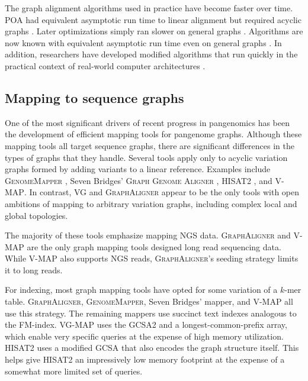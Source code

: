 \documentclass[11pt]{ucthesis}
\begin{document}
The graph alignment algorithms used in practice have become faster over time.
POA had equivalent asymptotic run time to linear alignment but required acyclic graphs \cite{lee2002multiple}. 
Later optimizations simply ran slower on general graphs \cite{kavya2019sequence}.
Algorithms are now known with equivalent asymptotic run time even on general graphs \cite{jain2020complexity}.
In addition, researchers have developed modified algorithms that run quickly in the practical context of real-world computer architectures \cite{rautiainen2019bit,jain2019accelerating,ivanov2020astarix}.

\subsection{Mapping to sequence graphs}

One of the most significant drivers of recent progress in pangenomics has been the development of efficient mapping tools for pangenome graphs.
Although these mapping tools all target sequence graphs, there are significant differences in the types of graphs that they handle.
Several tools apply only to acyclic variation graphs formed by adding variants to a linear reference.
Examples include \textsc{GenomeMapper} \cite{schneeberger2009simultaneous}, Seven Bridges' \textsc{Graph Genome Aligner} \cite{rakocevic2019fast}, \textsc{HISAT2} \cite{kim2019graph}, and \textsc{V-MAP}\cite{vaddadi2019read}.
In contrast, \textsc{VG} \cite{garrison2018variation} and \textsc{GraphAligner} \cite{rautiainen2020graphaligner} appear to be the only tools with open ambitions of mapping to arbitrary variation graphs, including complex local and global topologies.

The majority of these tools emphasize mapping NGS data. 
\textsc{GraphAligner} and \textsc{V-MAP} are the only graph mapping tools designed long read sequencing data.
While \textsc{V-MAP} also supports NGS reads, \textsc{GraphAligner}'s seeding strategy limits it to long reads.

For indexing, most graph mapping tools have opted for some variation of a $k$-mer table. 
\textsc{GraphAligner}, \textsc{GenomeMapper}, Seven Bridges' mapper, and \textsc{V-MAP} all use this strategy. 
The remaining mappers use succinct text indexes analogous to the FM-index.
\textsc{VG-MAP} uses the GCSA2 \cite{siren2017indexing} and a longest-common-prefix array, which enable very specific queries at the expense of high memory utilization.
\textsc{HISAT2} uses a modified GCSA \cite{siren2014indexing} that also encodes the graph structure itself.
This helps give \textsc{HISAT2} an impressively low memory footprint at the expense of a somewhat more limited set of queries.
\end{document}
